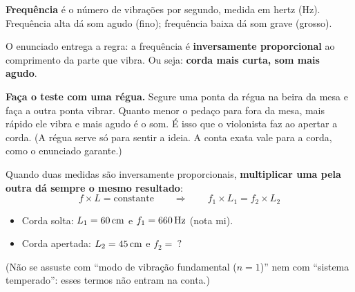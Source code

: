 \begin{enunciado}

\end{enunciado}


\begin{ideia}
\textbf{Frequência} é o número de vibrações por segundo, medida em hertz (Hz). Frequência alta dá som agudo (fino);
frequência baixa dá som grave (grosso).

O enunciado entrega a regra: a frequência é \textbf{inversamente proporcional} ao comprimento da parte que vibra.
Ou seja: \textbf{corda mais curta, som mais agudo}.

\textbf{Faça o teste com uma régua.} Segure uma ponta da régua na beira da mesa e faça a outra ponta vibrar. Quanto menor o
pedaço para fora da mesa, mais rápido ele vibra e mais agudo é o som. É isso que o violonista faz ao apertar a corda.
(A régua serve só para sentir a ideia. A conta exata vale para a corda, como o enunciado garante.)

Quando duas medidas são inversamente proporcionais, \textbf{multiplicar uma pela outra dá sempre o mesmo resultado}:
\[ f \times L = \text{constante} \qquad\Rightarrow\qquad f_1 \times L_1 = f_2 \times L_2 \]

\begin{center}
\end{center}
\end{ideia}

\passoapasso
{}
\begin{itemize}
  \item Corda solta: $L_1 = 60\,\text{cm}$ e $f_1 = 660\,\text{Hz}$ (nota mi).
  \item Corda apertada: $L_2 = 45\,\text{cm}$ e $f_2 =\ ?$
\end{itemize}
(Não se assuste com ``modo de vibração fundamental ($n = 1$)'' nem com ``sistema temperado'': esses termos não entram na conta.)

